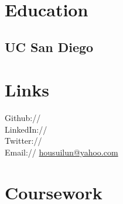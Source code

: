 \documentclass[]{deedy-resume-openfont}
\begin{document}
%
%
\lastupdated

%
%



%
%

\begin{minipage}[t]{0.33\textwidth} 


\section{Education} 

\subsection{UC San Diego}
\sectionsep


\section{Links} 
Github:// \href{https://github.com/jonwho}{} \\
LinkedIn://  \href{https://www.linkedin.com/in/jonwho}{} \\
Twitter://  \href{https://twitter.com/lj080805}{} \\
Email:// \href{mailto:housuilun@yahoo.com}{housuilun@yahoo.com}
\sectionsep


\section{Coursework}

\end{minipage}
\end{document}
